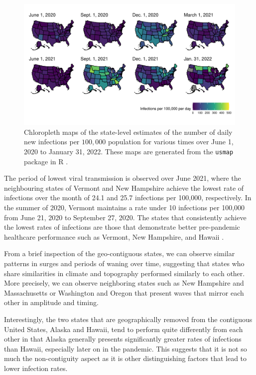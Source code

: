 \documentclass{article}
\begin{document}
\begin{figure}[!tb]
\centering
    \includegraphics[width=.99\textwidth]{chloro_inf_rates_Oct2.pdf}
    \caption{Chloropleth maps of the state-level estimates of the number of 
    daily new infections per $100,000$ population for various times 
    over June 1, 2020 to January 31, 2022. These maps are generated from the \texttt{usmap} 
    package in R \citep{lorenzo2023usmap}.} 
    \label{fig:chloro_inf_rates}
\end{figure}

The period of lowest viral transmission is observed over June 2021,
where the neighbouring states of Vermont and New Hampshire achieve the lowest rate of infections 
over the month of 24.1 and 25.7 infections per 100,000, respectively. In the summer of 
2020, Vermont maintains a rate under 10 infections per 100,000 from June 21, 2020 to 
September 27, 2020. The states that consistently achieve the lowest rates
of infections are those that demonstrate better pre-pandemic healthcare performance such as 
Vermont, New Hampshire, and Hawaii \citep{radley2020}.

From a brief inspection of the geo-contiguous states, we can observe similar patterns in
surges and periods of waning over time, suggesting that states who share similarities in
climate and topography performed similarly to each other. More precisely, we can observe
neighboring states such as New Hampshire and Massachusetts or Washington and Oregon that
present waves that mirror each other in amplitude and timing. 

Interestingly, the two states that are geographically removed from the
contiguous United States, Alaska and Hawaii, tend to perform quite differently
from each other in that Alaska generally presents significantly greater rates of
infections than Hawaii, especially later on in the pandemic. This suggests that
it is not so much the non-contiguity aspect as it is other distinguishing
factors that lead to lower infection rates.
\end{document}
